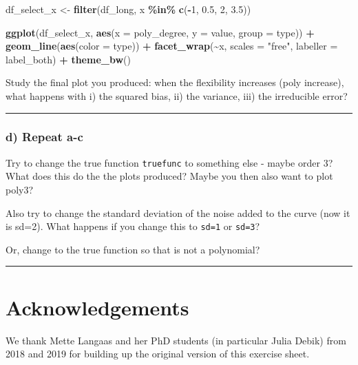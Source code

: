 \documentclass[
]{article}
\newenvironment{Shaded}{\begin{snugshade}}{\end{snugshade}}
\newcommand{\AttributeTok}[1]{\textcolor[rgb]{0.13,0.29,0.53}{#1}}
\newcommand{\DecValTok}[1]{\textcolor[rgb]{0.00,0.00,0.81}{#1}}
\newcommand{\FloatTok}[1]{\textcolor[rgb]{0.00,0.00,0.81}{#1}}
\newcommand{\FunctionTok}[1]{\textcolor[rgb]{0.13,0.29,0.53}{\textbf{#1}}}
\newcommand{\NormalTok}[1]{#1}
\newcommand{\OtherTok}[1]{\textcolor[rgb]{0.56,0.35,0.01}{#1}}
\newcommand{\SpecialCharTok}[1]{\textcolor[rgb]{0.81,0.36,0.00}{\textbf{#1}}}
\newcommand{\StringTok}[1]{\textcolor[rgb]{0.31,0.60,0.02}{#1}}
\begin{document}
\begin{Shaded}
\begin{Highlighting}[]
\NormalTok{df\_select\_x }\OtherTok{\textless{}{-}} \FunctionTok{filter}\NormalTok{(df\_long, x }\SpecialCharTok{\%in\%} \FunctionTok{c}\NormalTok{(}\SpecialCharTok{{-}}\DecValTok{1}\NormalTok{, }\FloatTok{0.5}\NormalTok{, }\DecValTok{2}\NormalTok{, }\FloatTok{3.5}\NormalTok{))}

\FunctionTok{ggplot}\NormalTok{(df\_select\_x, }\FunctionTok{aes}\NormalTok{(}\AttributeTok{x =}\NormalTok{ poly\_degree, }\AttributeTok{y =}\NormalTok{ value, }\AttributeTok{group =}\NormalTok{ type)) }\SpecialCharTok{+}
  \FunctionTok{geom\_line}\NormalTok{(}\FunctionTok{aes}\NormalTok{(}\AttributeTok{color =}\NormalTok{ type)) }\SpecialCharTok{+}
  \FunctionTok{facet\_wrap}\NormalTok{(}\SpecialCharTok{\textasciitilde{}}\NormalTok{x, }\AttributeTok{scales =} \StringTok{"free"}\NormalTok{, }\AttributeTok{labeller =}\NormalTok{ label\_both) }\SpecialCharTok{+}
  \FunctionTok{theme\_bw}\NormalTok{()}
\end{Highlighting}
\end{Shaded}

Study the final plot you produced: when the flexibility increases (poly
increase), what happens with i) the squared bias, ii) the variance, iii)
the irreducible error?

\begin{center}\rule{0.5\linewidth}{0.5pt}\end{center}

\subsubsection{d) Repeat a-c}\label{d-repeat-a-c}

Try to change the true function \texttt{truefunc} to something else -
maybe order \(3\)? What does this do the the plots produced? Maybe you
then also want to plot poly3?

Also try to change the standard deviation of the noise added to the
curve (now it is sd=2). What happens if you change this to \texttt{sd=1}
or \texttt{sd=3}?

Or, change to the true function so that is not a polynomial?

\begin{center}\rule{0.5\linewidth}{0.5pt}\end{center}

\section{Acknowledgements}\label{acknowledgements}

We thank Mette Langaas and her PhD students (in particular Julia Debik)
from 2018 and 2019 for building up the original version of this exercise
sheet.
\end{document}

